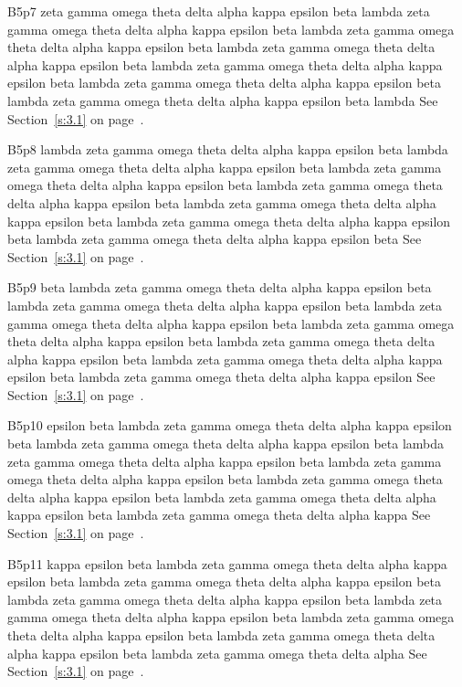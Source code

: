 B5p7 zeta gamma omega theta delta alpha kappa epsilon beta lambda zeta gamma omega theta delta alpha kappa epsilon beta lambda zeta gamma omega theta delta alpha kappa epsilon beta lambda zeta gamma omega theta delta alpha kappa epsilon beta lambda zeta gamma omega theta delta alpha kappa epsilon beta lambda zeta gamma omega theta delta alpha kappa epsilon beta lambda zeta gamma omega theta delta alpha kappa epsilon beta lambda See Section~\ref{s:3.1} on page~\pageref{s:3.1}.

B5p8 lambda zeta gamma omega theta delta alpha kappa epsilon beta lambda zeta gamma omega theta delta alpha kappa epsilon beta lambda zeta gamma omega theta delta alpha kappa epsilon beta lambda zeta gamma omega theta delta alpha kappa epsilon beta lambda zeta gamma omega theta delta alpha kappa epsilon beta lambda zeta gamma omega theta delta alpha kappa epsilon beta lambda zeta gamma omega theta delta alpha kappa epsilon beta See Section~\ref{s:3.1} on page~\pageref{s:3.1}.

B5p9 beta lambda zeta gamma omega theta delta alpha kappa epsilon beta lambda zeta gamma omega theta delta alpha kappa epsilon beta lambda zeta gamma omega theta delta alpha kappa epsilon beta lambda zeta gamma omega theta delta alpha kappa epsilon beta lambda zeta gamma omega theta delta alpha kappa epsilon beta lambda zeta gamma omega theta delta alpha kappa epsilon beta lambda zeta gamma omega theta delta alpha kappa epsilon See Section~\ref{s:3.1} on page~\pageref{s:3.1}.

B5p10 epsilon beta lambda zeta gamma omega theta delta alpha kappa epsilon beta lambda zeta gamma omega theta delta alpha kappa epsilon beta lambda zeta gamma omega theta delta alpha kappa epsilon beta lambda zeta gamma omega theta delta alpha kappa epsilon beta lambda zeta gamma omega theta delta alpha kappa epsilon beta lambda zeta gamma omega theta delta alpha kappa epsilon beta lambda zeta gamma omega theta delta alpha kappa See Section~\ref{s:3.1} on page~\pageref{s:3.1}.

B5p11 kappa epsilon beta lambda zeta gamma omega theta delta alpha kappa epsilon beta lambda zeta gamma omega theta delta alpha kappa epsilon beta lambda zeta gamma omega theta delta alpha kappa epsilon beta lambda zeta gamma omega theta delta alpha kappa epsilon beta lambda zeta gamma omega theta delta alpha kappa epsilon beta lambda zeta gamma omega theta delta alpha kappa epsilon beta lambda zeta gamma omega theta delta alpha See Section~\ref{s:3.1} on page~\pageref{s:3.1}.

